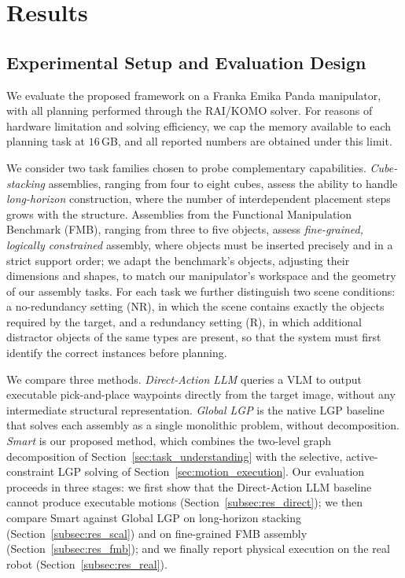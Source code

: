 \documentclass[journal]{IEEEtran}
\begin{document}
\section{Results}

\subsection{Experimental Setup and Evaluation Design}
\label{subsec:setup}

We evaluate the proposed framework on a Franka Emika Panda manipulator, with
all planning performed through the RAI/KOMO solver. For reasons of hardware
limitation and solving efficiency, we cap the memory available to each planning
task at $16$\,GB, and all reported numbers are obtained under this limit.

We consider two task families chosen to probe complementary capabilities.
\emph{Cube-stacking} assemblies, ranging from four to eight cubes, assess the
ability to handle \emph{long-horizon} construction, where the number of
interdependent placement steps grows with the structure. Assemblies from the Functional Manipulation Benchmark (FMB),
ranging from three to five objects, assess \emph{fine-grained, logically
constrained} assembly, where objects must be inserted precisely and in a strict
support order; we adapt the benchmark's objects, adjusting their dimensions and
shapes, to match our manipulator's workspace and the geometry of our assembly
tasks. For each task we further distinguish two scene conditions: a
no-redundancy setting (NR), in which the scene contains exactly the objects
required by the target, and a redundancy setting (R), in which additional
distractor objects of the same types are present, so that the system must first
identify the correct instances before planning.

We compare three methods. \emph{Direct-Action LLM} queries a VLM to output
executable pick-and-place waypoints directly from the target image, without any
intermediate structural representation. \emph{Global LGP} is the native LGP
baseline that solves each assembly as a single monolithic problem, without
decomposition. \emph{Smart} is our proposed method, which combines the
two-level graph decomposition of Section~\ref{sec:task_understanding} with the
selective, active-constraint LGP solving of Section~\ref{sec:motion_execution}.
Our evaluation proceeds in three stages: we first show that the Direct-Action
LLM baseline cannot produce executable motions
(Section~\ref{subsec:res_direct}); we then compare Smart against Global LGP on
long-horizon stacking (Section~\ref{subsec:res_scal}) and on fine-grained FMB
assembly (Section~\ref{subsec:res_fmb}); and we finally report physical
execution on the real robot (Section~\ref{subsec:res_real}).
\end{document}
